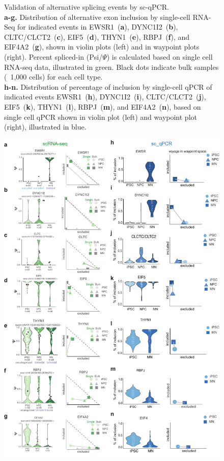 \clearpage
\thispagestyle{facingcaption}
\begin{figure}[h]
\captionsetup{labelformat=prev-page}
  \caption[Validation of alternative splicing events by sc-qPCR.]{
  Validation of alternative splicing events by sc-qPCR.\\
\textbf{a-g.} Distribution of alternative exon inclusion by single-cell RNA-Seq for indicated events in EWSR1~(\textbf{a}), DYNC1I2~(\textbf{b}), CLTC/CLCT2~(\textbf{c}), EIF5~(\textbf{d}), THYN1~(\textbf{e}), RBPJ~(\textbf{f}), and EIF4A2~(\textbf{g}), shown in violin plots (left) and in waypoint plots (right). Percent spliced-in (Psi/$\Psi$) is calculated based on single cell RNA-seq data, illustrated in green. Black dots indicate bulk samples (~1,000 cells) for each cell type.\\
\textbf{h-n.} Distribution of percentage of inclusion by single-cell qPCR of indicated events EWSR1~(\textbf{h}), DYNC1I2~(\textbf{i}), CLTC/CLCT2~(\textbf{j}), EIF5~(\textbf{k}), THYN1~(\textbf{l}), RBPJ~(\textbf{m}), and EIF4A2~(\textbf{n}), based on single cell qPCR shown in violin plot (left) and waypoint plot (right), illustrated in blue.
}
\label{fig:qpcr_validation}
\end{figure}
\clearpage
\begin{figure}[h]
\ContinuedFloat
\captionsetup{labelformat=empty}
\centering
\includegraphics[width=5.8in]{figures/qpcr_validation.pdf}
\end{figure}
